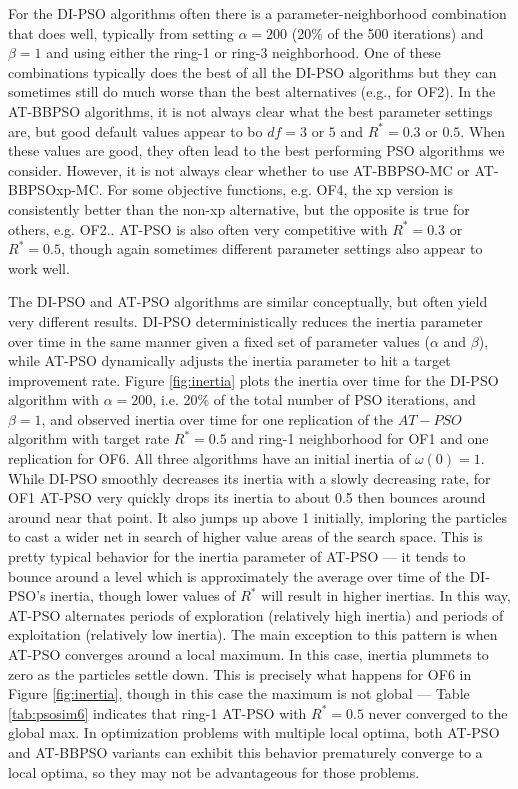 \documentclass[12pt]{article}
\begin{document}
For the DI-PSO algorithms often there is a parameter-neighborhood combination that does well, typically from setting $\alpha=200$ (20\% of the 500 iterations) and $\beta=1$ and using either the ring-1 or ring-3 neighborhood. One of these combinations typically does the best of all the DI-PSO algorithms but they can sometimes still do much worse than the best alternatives (e.g., for OF2). In the AT-BBPSO algorithms, it is not always clear what the best parameter settings are, but good default values appear to bo $df=3$ or $5$ and $R^*=0.3$ or $0.5$. When these values are good, they often lead to the best performing PSO algorithms we consider. However, it is not always clear whether to use AT-BBPSO-MC or AT-BBPSOxp-MC. For some objective functions, e.g. OF4, the xp version is consistently better than the non-xp alternative, but the opposite is true for others, e.g. OF2.. AT-PSO is also often very competitive with $R^*=0.3$ or $R^*=0.5$, though again sometimes different parameter settings also appear to work well. 

The DI-PSO and AT-PSO algorithms are similar conceptually, but often yield very different results. DI-PSO deterministically reduces the inertia parameter over time in the same manner given a fixed set of parameter values ($\alpha$ and $\beta$), while AT-PSO dynamically adjusts the inertia parameter to hit a target improvement rate. Figure \ref{fig:inertia} plots the inertia over time for the DI-PSO algorithm with $\alpha=200$, i.e. 20\% of the total number of PSO iterations, and $\beta=1$, and observed inertia over time for one replication of the $AT-PSO$ algorithm with target rate $R^*=0.5$ and ring-1 neighborhood for OF1 and one replication for OF6. All three algorithms have an initial inertia of $\omega(0)=1$. While DI-PSO smoothly decreases its inertia with a slowly decreasing rate, for OF1 AT-PSO very quickly drops its inertia to about 0.5 then bounces around around near that point. It also jumps up above 1 initially, imploring the particles to cast a wider net in search of higher value areas of the search space. This is pretty typical behavior for the inertia parameter of AT-PSO --- it tends to bounce around a level which is approximately the average over time of the DI-PSO's inertia, though lower values of $R^*$ will result in higher inertias. In this way, AT-PSO alternates periods of exploration (relatively high inertia) and periods of exploitation (relatively low inertia). The main exception to this pattern is when AT-PSO converges around a local maximum. In this case, inertia plummets to zero as the particles settle down. This is precisely what happens for OF6 in Figure \ref{fig:inertia}, though in this case the maximum is not global --- Table \ref{tab:psosim6} indicates that ring-1 AT-PSO with $R^*=0.5$ never converged to the global max. In optimization problems with multiple local optima, both AT-PSO and AT-BBPSO variants can exhibit this behavior prematurely converge to a local optima, so they may not be advantageous for those problems. 
\end{document}
